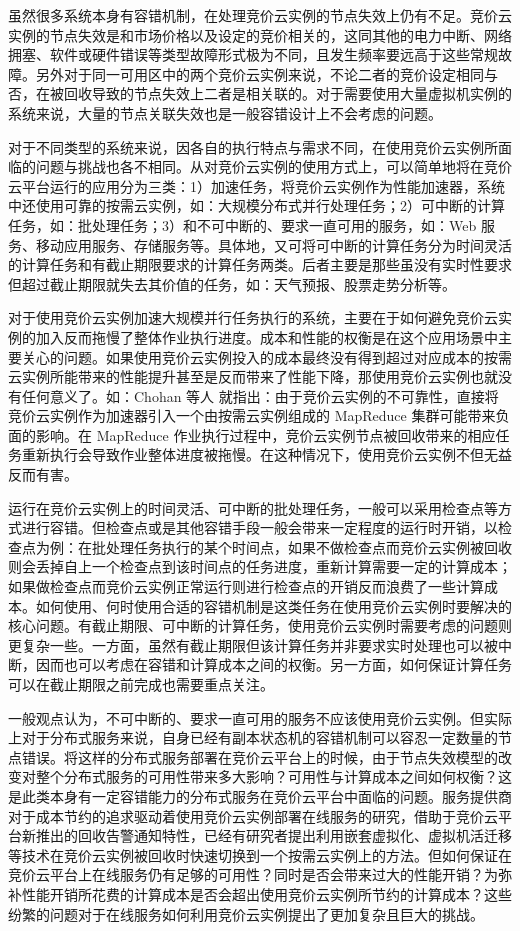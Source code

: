 虽然很多系统本身有容错机制，在处理竞价云实例的节点失效上仍有不足。竞价云实例的节点失效是和市场价格以及设定的竞价相关的，这同其他的电力中断、网络拥塞、软件或硬件错误等类型故障形式极为不同，且发生频率要远高于这些常规故障。另外对于同一可用区中的两个竞价云实例来说，不论二者的竞价设定相同与否，在被回收导致的节点失效上二者是相关联的。对于需要使用大量虚拟机实例的系统来说，大量的节点关联失效也是一般容错设计上不会考虑的问题。

对于不同类型的系统来说，因各自的执行特点与需求不同，在使用竞价云实例所面临的问题与挑战也各不相同。从对竞价云实例的使用方式上，可以简单地将在竞价云平台运行的应用分为三类：1）加速任务，将竞价云实例作为性能加速器，系统中还使用可靠的按需云实例，如：大规模分布式并行处理任务；2）可中断的计算任务，如：批处理任务；3）和不可中断的、要求一直可用的服务，如：Web 服务、移动应用服务、存储服务等。具体地，又可将可中断的计算任务分为时间灵活的计算任务和有截止期限要求的计算任务两类。后者主要是那些虽没有实时性要求但超过截止期限就失去其价值的任务，如：天气预报、股票走势分析等。

对于使用竞价云实例加速大规模并行任务执行的系统，主要在于如何避免竞价云实例的加入反而拖慢了整体作业执行进度。成本和性能的权衡是在这个应用场景中主要关心的问题。如果使用竞价云实例投入的成本最终没有得到超过对应成本的按需云实例所能带来的性能提升甚至是反而带来了性能下降，那使用竞价云实例也就没有任何意义了。如：Chohan 等人 \cite{chohan2010see} 就指出：由于竞价云实例的不可靠性，直接将竞价云实例作为加速器引入一个由按需云实例组成的 MapReduce 集群可能带来负面的影响。在 MapReduce 作业执行过程中，竞价云实例节点被回收带来的相应任务重新执行会导致作业整体进度被拖慢。在这种情况下，使用竞价云实例不但无益反而有害。

运行在竞价云实例上的时间灵活、可中断的批处理任务，一般可以采用检查点等方式进行容错。但检查点或是其他容错手段一般会带来一定程度的运行时开销，以检查点为例：在批处理任务执行的某个时间点，如果不做检查点而竞价云实例被回收则会丢掉自上一个检查点到该时间点的任务进度，重新计算需要一定的计算成本；如果做检查点而竞价云实例正常运行则进行检查点的开销反而浪费了一些计算成本。如何使用、何时使用合适的容错机制是这类任务在使用竞价云实例时要解决的核心问题。有截止期限、可中断的计算任务，使用竞价云实例时需要考虑的问题则更复杂一些。一方面，虽然有截止期限但该计算任务并非要求实时处理也可以被中断，因而也可以考虑在容错和计算成本之间的权衡。另一方面，如何保证计算任务可以在截止期限之前完成也需要重点关注。

一般观点认为，不可中断的、要求一直可用的服务不应该使用竞价云实例。但实际上对于分布式服务来说，自身已经有副本状态机的容错机制可以容忍一定数量的节点错误。将这样的分布式服务部署在竞价云平台上的时候，由于节点失效模型的改变对整个分布式服务的可用性带来多大影响？可用性与计算成本之间如何权衡？这是此类本身有一定容错能力的分布式服务在竞价云平台中面临的问题。服务提供商对于成本节约的追求驱动着使用竞价云实例部署在线服务的研究，借助于竞价云平台新推出的回收告警通知特性，已经有研究者提出利用嵌套虚拟化、虚拟机活迁移等技术在竞价云实例被回收时快速切换到一个按需云实例上的方法。但如何保证在竞价云平台上在线服务仍有足够的可用性？同时是否会带来过大的性能开销？为弥补性能开销所花费的计算成本是否会超出使用竞价云实例所节约的计算成本？这些纷繁的问题对于在线服务如何利用竞价云实例提出了更加复杂且巨大的挑战。

